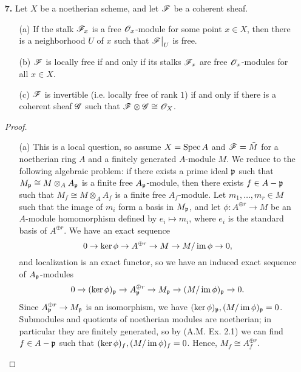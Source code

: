 \documentclass{article}
\begin{document}
\begin{enumerate} [label=\textbf{\arabic*.}, leftmargin=0em]
\item[\textbf{7.}] Let $X$ be a noetherian scheme, and let $\mathscr{F}$ be a coherent sheaf.
\begin{itemize}
    \item[(a)] If the stalk $\mathscr{F}_x$ is a free $\mathscr{O}_x$-module for some point $x \in X$, then there is a neighborhood $U$ of $x$ such that $\restr{\fF}{U}$ is free.
    \item[(b)] $\mathscr{F}$ is locally free if and only if its stalks $\mathscr{F}_x$ are free $\mathscr{O}_x$-modules for all $x \in X$.
    \item[(c)] $\mathscr{F}$ is invertible (i.e. locally free of rank $1$) if and only if there is a coherent sheaf $\mathscr{G}$ such that $\mathscr{F} \otimes \mathscr{G} \cong \mathscr{O}_X$.
\end{itemize}

\begin{proof} $ $ \vspace{0pt}
    \begin{itemize}[leftmargin=0em]
        \item[(a)] This is a local question, so assume $X = \operatorname{Spec}{A}$ and $\mathscr{F} = \tilde{M}$ for a noetherian ring $A$ and a finitely generated $A$-module $M$. We reduce to the following algebraic problem: if there exists a prime ideal $\mathfrak{p}$ such that $M_{\mathfrak{p}} \cong M \otimes_A A_{\mathfrak{p}}$ is a finite free $A_{\mathfrak{p}}$-module, then there exists $f \in A - \mathfrak{p}$ such that $M_{f} \cong M \otimes_A A_f$ is a finite free $A_f$-module. Let $m_1, \dots, m_r \in M$ such that the image of $m_i$ form a basis in $M_{\mathfrak{p}}$, and let $\phi : A^{\oplus r} \to M$ be an $A$-module homomorphism defined by $e_i \mapsto m_i$, where $e_i$ is the standard basis of $A^{\oplus r}$. We have an exact sequence
        \begin{equation*}
            0 \to \ker{\phi} \to A^{\oplus r} \to M \to M / \operatorname{im}{\phi} \to 0,
        \end{equation*}
        and localization is an exact functor, so we have an induced exact sequence of $A_{\mathfrak{p}}$-modules
        \begin{equation*}
            0 \to (\ker{\phi})_{\mathfrak{p}} \to A_{\mathfrak{p}}^{\oplus r} \to M_{\mathfrak{p}} \to (M / \operatorname{im}{\phi})_{\mathfrak{p}} \to 0.
        \end{equation*}
        Since $A_{\mathfrak{p}}^{\oplus r} \to M_{\mathfrak{p}}$ is an isomorphism, we have $(\ker{\phi})_{\mathfrak{p}}, (M / \operatorname{im}{\phi})_{\mathfrak{p}} = 0$. Submodules and quotients of noetherian modules are noetherian; in particular they are finitely generated, so by (A.M. Ex. 2.1) we can find $f \in A - \mathfrak{p}$ such that $(\ker{\phi})_f, (M / \operatorname{im}{\phi})_f = 0$. Hence, $M_f \cong A_f^{\oplus r}$.


\end{itemize}
\end{proof}
\end{enumerate}
\end{document}
